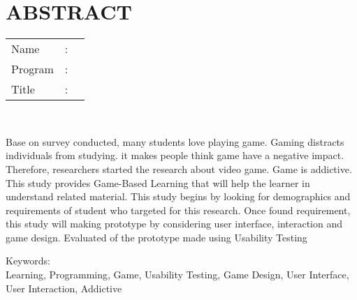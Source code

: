 %
%
%

	\chapter*{ABSTRACT}

\vspace*{0.2cm}

\noindent \begin{tabular}{l l p{11.0cm}}
	Name&: & \penulis \\
	Program&: & \programEng \\
	Title&: & \judulInggris \\
\end{tabular} \\ 

\vspace*{0.5cm}

\noindent 
Base on survey conducted, many students love playing game. Gaming distracts individuals from studying. it makes people think game have a negative impact. Therefore, researchers started the research about video game. Game is addictive. This study provides Game-Based Learning that will help the learner in understand related material. This study begins by looking for demographics and requirements of student who targeted for this research. Once found requirement, this study will making prototype by considering user interface, interaction and game design. Evaluated of the prototype made using Usability Testing

\vspace*{0.2cm}

\noindent Keywords: \\ 
\noindent Learning, Programming, Game, Usability Testing, Game Design, User Interface, User Interaction, Addictive\\

\newpage
